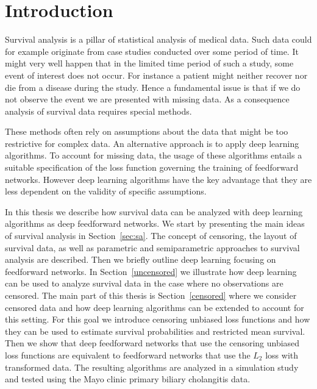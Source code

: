 \documentclass[12pt, a4paper]{scrartcl}
\theoremstyle{definition}
\theoremstyle{plain}
\numberwithin{equation}{section}
\numberwithin{figure}{section}
\numberwithin{table}{section}
\begin{document}
	
	\thispagestyle{plain}
	\tableofcontents
	\enlargethispage{3em}
	\newpage

	
	\section{Introduction} \label{introduction}
	
	Survival analysis %
	is a pillar of statistical analysis of medical data. %
	Such data could for example originate from case studies conducted over some period of time. %
	It might very well happen that in the limited time period of such a study, some event of interest does not occur. 
	For instance a patient might neither recover nor die from a disease during the study.
	Hence a fundamental issue is that if we do not observe the event we are presented with missing data. %
	As a consequence analysis of survival data requires special methods. %
	
	These methods often rely on assumptions about the data that might be too restrictive for complex data.
	An alternative approach is to apply deep learning algorithms. %
	To account for missing data, the usage of these algorithms entails a suitable specification of the loss function governing the training of feedforward networks.
	However deep learning algorithms have the key advantage that they are less dependent on the validity of specific assumptions.

	In this thesis we describe how survival data can be analyzed with deep learning algorithms as deep feedforward networks.
	We start by presenting the main ideas of survival analysis in Section~\ref{sec:sa}.
	The concept of censoring, the layout of survival data, as well as parametric and semiparametric approaches to survival analysis are described.
	Then we briefly outline deep learning focusing on feedforward networks.
	In Section~\ref{uncensored} we illustrate how deep learning can be used to analyze survival data in the case where no observations are censored.
	The main part of this thesis is Section~\ref{censored} where we consider censored data and how deep learning algorithms can be extended to account for this setting.
	For this goal we introduce censoring unbiased loss functions and how they can be used to estimate survival probabilities and restricted mean survival.
	Then we show that deep feedforward networks that use the censoring unbiased loss functions are equivalent to feedforward networks that use the $L_2$ loss with transformed data.
	The resulting algorithms are analyzed in a simulation study and tested using the Mayo clinic primary biliary cholangitis data. 
	\newpage
	
\end{document}

